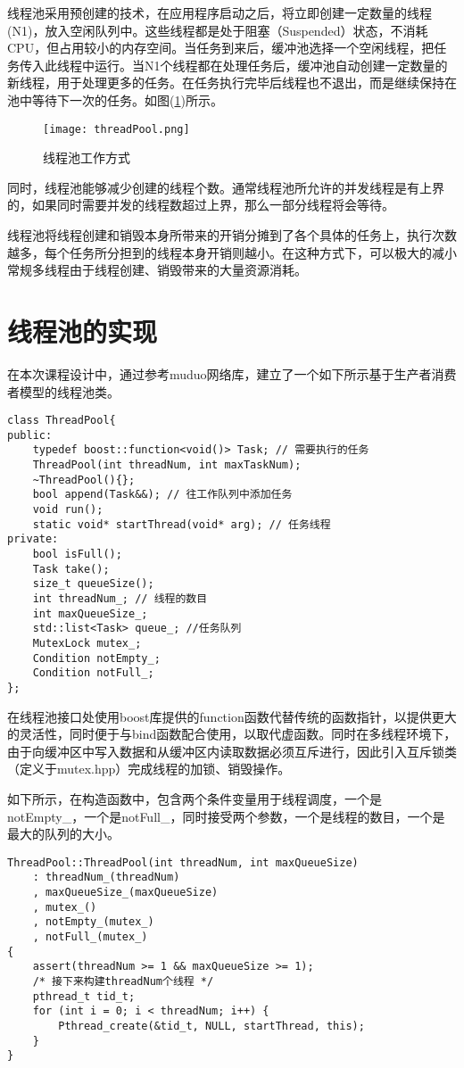 \documentclass[bachelor]{thesis-uestc}
\begin{document}
线程池采用预创建的技术，在应用程序启动之后，将立即创建一定数量的线程(N1)，放入空闲队列中。这些线程都是处于阻塞（Suspended）状态，不消耗CPU，但占用较小的内存空间。当任务到来后，缓冲池选择一个空闲线程，把任务传入此线程中运行。当N1个线程都在处理任务后，缓冲池自动创建一定数量的新线程，用于处理更多的任务。在任务执行完毕后线程也不退出，而是继续保持在池中等待下一次的任务。如图(\ref{线程池工作方式})所示。

\begin{figure}[h]
\texttt{[image: threadPool.png]}
\caption{线程池工作方式}
\label{线程池工作方式} 
\end{figure}

同时，线程池能够减少创建的线程个数。通常线程池所允许的并发线程是有上界的，如果同时需要并发的线程数超过上界，那么一部分线程将会等待。

线程池将线程创建和销毁本身所带来的开销分摊到了各个具体的任务上，执行次数越多，每个任务所分担到的线程本身开销则越小。在这种方式下，可以极大的减小常规多线程由于线程创建、销毁带来的大量资源消耗。

\section{线程池的实现}

在本次课程设计中，通过参考muduo网络库，建立了一个如下所示基于生产者消费者模型的线程池类。
\begin{lstlisting}
class ThreadPool{
public:
	typedef boost::function<void()> Task; // 需要执行的任务 
	ThreadPool(int threadNum, int maxTaskNum);
	~ThreadPool(){};
	bool append(Task&&); // 往工作队列中添加任务 
	void run();
	static void* startThread(void* arg); // 任务线程 
private:
	bool isFull();
	Task take();
	size_t queueSize();
	int threadNum_; // 线程的数目
	int maxQueueSize_;
	std::list<Task> queue_; //任务队列 
	MutexLock mutex_;
	Condition notEmpty_;
	Condition notFull_;
};
\end{lstlisting}

在线程池接口处使用boost库提供的function函数代替传统的函数指针，以提供更大的灵活性，同时便于与bind函数配合使用，以取代虚函数。同时在多线程环境下，由于向缓冲区中写入数据和从缓冲区内读取数据必须互斥进行，因此引入互斥锁类（定义于mutex.hpp）完成线程的加锁、销毁操作。

如下所示，在构造函数中，包含两个条件变量用于线程调度，一个是notEmpty\_，一个是notFull\_，同时接受两个参数，一个是线程的数目，一个是最大的队列的大小。

\begin{lstlisting}
ThreadPool::ThreadPool(int threadNum, int maxQueueSize)
    : threadNum_(threadNum)
    , maxQueueSize_(maxQueueSize)
    , mutex_()
    , notEmpty_(mutex_)
    , notFull_(mutex_)
{
    assert(threadNum >= 1 && maxQueueSize >= 1);
    /* 接下来构建threadNum个线程 */
    pthread_t tid_t;
    for (int i = 0; i < threadNum; i++) {
        Pthread_create(&tid_t, NULL, startThread, this);
    }
}
\end{lstlisting}
\end{document}
